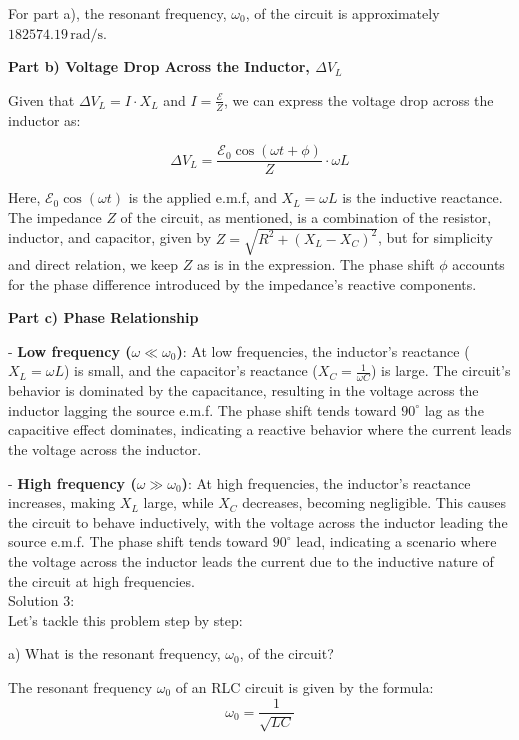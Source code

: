 \documentclass[a4paper,11pt]{article}
\begin{document}
For part a), the resonant frequency, \( \omega_{0} \), of the circuit is approximately \( 182574.19 \, \text{rad/s} \).

\textbf{Part b) Voltage Drop Across the Inductor, \( \Delta V_{L} \)}

Given that \( \Delta V_{L} = I \cdot X_{L} \) and \( I = \frac{\mathcal{E}}{Z} \), we can express the voltage drop across the inductor as:

\[
\Delta V_{L} = \frac{\mathcal{E}_{0} \cos(\omega t + \phi)}{Z} \cdot \omega L
\]

Here, \(\mathcal{E}_{0} \cos(\omega t)\) is the applied e.m.f, and \(X_{L} = \omega L\) is the inductive reactance. The impedance \(Z\) of the circuit, as mentioned, is a combination of the resistor, inductor, and capacitor, given by \(Z = \sqrt{R^2 + (X_{L} - X_{C})^2}\), but for simplicity and direct relation, we keep \(Z\) as is in the expression. The phase shift \( \phi \) accounts for the phase difference introduced by the impedance's reactive components.

\textbf{Part c) Phase Relationship}

- \textbf{Low frequency (\( \omega \ll \omega_{0} \))}: At low frequencies, the inductor's reactance (\(X_{L} = \omega L\)) is small, and the capacitor's reactance (\(X_{C} = \frac{1}{\omega C}\)) is large. The circuit's behavior is dominated by the capacitance, resulting in the voltage across the inductor lagging the source e.m.f. The phase shift tends toward \(90^\circ\) lag as the capacitive effect dominates, indicating a reactive behavior where the current leads the voltage across the inductor.

- \textbf{High frequency (\( \omega \gg \omega_{0} \))}: At high frequencies, the inductor's reactance increases, making \(X_{L}\) large, while \(X_{C}\) decreases, becoming negligible. This causes the circuit to behave inductively, with the voltage across the inductor leading the source e.m.f. The phase shift tends toward \(90^\circ\) lead, indicating a scenario where the voltage across the inductor leads the current due to the inductive nature of the circuit at high frequencies. \\ 

\noindent Solution 3: \\

Let's tackle this problem step by step:

a) What is the resonant frequency, \( \omega_{0} \), of the circuit?

The resonant frequency \( \omega_{0} \) of an RLC circuit is given by the formula:
\[ \omega_{0} = \frac{1}{\sqrt{LC}} \]
\end{document}
